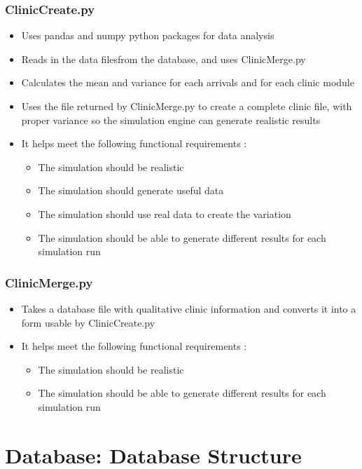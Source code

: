 \documentclass[12pt]{article}
\begin{document}
\subsubsection{ClinicCreate.py}
\begin{itemize}
	\item Uses pandas and numpy python packages for data analysis
	\item Reads in the data filesfrom the database, and uses ClinicMerge.py
	\item Calculates the mean and variance for each arrivals and for each clinic module
	\item Uses the file returned by ClinicMerge.py to create a complete clinic file, with proper variance so the simulation engine can generate realistic results
	\item It helps meet the following functional requirements :
\begin{itemize}
	\item The simulation should be realistic
	\item The simulation should generate useful data 
	\item The simulation should use real data to create the variation
	\item The simulation should be able to generate different results for each simulation run
\end{itemize}
\end{itemize}

\subsubsection{ClinicMerge.py}
\begin{itemize}
	\item Takes a database file with qualitative clinic information and converts it into a form usable by ClinicCreate.py
	\item It helps meet the following functional requirements :
	\begin{itemize}
		\item The simulation should be realistic
		\item The simulation should be able to generate different results for each simulation run
	\end{itemize} 
\end{itemize}

\section{Database: Database Structure}
\end{document}
